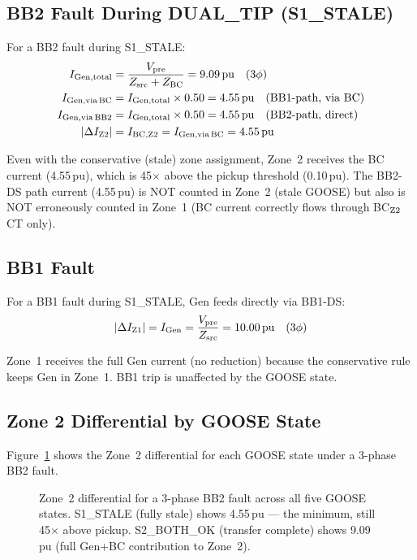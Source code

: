 \documentclass[11pt, a4paper]{article}
\begin{document}
\subsection{BB2 Fault During DUAL\_TIP (S1\_STALE)}

For a BB2 fault during S1\_STALE:
\begin{align}
  I_{\rm Gen,total} &= \frac{V_{\rm pre}}{Z_{\rm src} + Z_{\rm BC}} = 9.09\,\text{pu}
                      \quad (3\phi) \\
  I_{\rm Gen,via\,BC} &= I_{\rm Gen,total} \times 0.50 = 4.55\,\text{pu}
                         \quad \text{(BB1-path, via BC)} \\
  I_{\rm Gen,via\,BB2} &= I_{\rm Gen,total} \times 0.50 = 4.55\,\text{pu}
                          \quad \text{(BB2-path, direct)} \\
  |\Delta I_{\rm Z2}| &= I_{\rm BC,Z2} = I_{\rm Gen,via\,BC} = 4.55\,\text{pu}
  \label{eq:z2stale}
\end{align}

Even with the conservative (stale) zone assignment, Zone~2 receives the BC
current (4.55\,pu), which is 45$\times$ above the pickup threshold (0.10\,pu).
The BB2-DS path current (4.55\,pu) is NOT counted in Zone~2 (stale GOOSE)
but also is NOT erroneously counted in Zone~1 (BC current correctly flows
through BC$_{\rm Z2}$ CT only).

\subsection{BB1 Fault}

For a BB1 fault during S1\_STALE, Gen feeds directly via BB1-DS:
\begin{equation}
  |\Delta I_{\rm Z1}| = I_{\rm Gen} = \frac{V_{\rm pre}}{Z_{\rm src}} = 10.00\,\text{pu}
  \quad (3\phi)
\end{equation}

Zone~1 receives the full Gen current (no reduction) because the conservative
rule keeps Gen in Zone~1.  BB1 trip is unaffected by the GOOSE state.

\subsection{Zone 2 Differential by GOOSE State}

Figure~\ref{fig:z2} shows the Zone~2 differential for each GOOSE state
under a 3-phase BB2 fault.

\begin{figure}[h]
  \centering
  
  \caption{Zone~2 differential for a 3-phase BB2 fault across all five GOOSE
           states.  S1\_STALE (fully stale) shows 4.55\,pu — the minimum,
           still 45$\times$ above pickup.  S2\_BOTH\_OK (transfer complete)
           shows 9.09\,pu (full Gen+BC contribution to Zone~2).}
  \label{fig:z2}
\end{figure}
\end{document}
